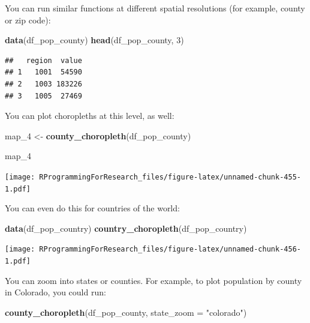 \documentclass[]{book}
\makeatletter
\newenvironment{Shaded}{\begin{snugshade}}{\end{snugshade}}
\newcommand{\KeywordTok}[1]{\textcolor[rgb]{0.13,0.29,0.53}{\textbf{{#1}}}}
\newcommand{\DataTypeTok}[1]{\textcolor[rgb]{0.13,0.29,0.53}{{#1}}}
\newcommand{\DecValTok}[1]{\textcolor[rgb]{0.00,0.00,0.81}{{#1}}}
\newcommand{\StringTok}[1]{\textcolor[rgb]{0.31,0.60,0.02}{{#1}}}
\newcommand{\NormalTok}[1]{{#1}}
\newenvironment{kframe}{%
\medskip{}
\setlength{\fboxsep}{.8em}
 \def\at@end@of@kframe{}%
 \ifinner\ifhmode%
  \def\at@end@of@kframe{\end{minipage}}%
  \begin{minipage}{\columnwidth}%
 \fi\fi%
 \def\FrameCommand##1{\hskip\@totalleftmargin \hskip-\fboxsep
 \colorbox{shadecolor}{##1}\hskip-\fboxsep
     \hskip-\linewidth \hskip-\@totalleftmargin \hskip\columnwidth}%
 \MakeFramed {\advance\hsize-\width
   \@totalleftmargin\z@ \linewidth\hsize
   \@setminipage}}%
 {\par\unskip\endMakeFramed%
 \at@end@of@kframe}
\renewenvironment{Shaded}{\begin{kframe}}{\end{kframe}}
\makeatother
\begin{document}
You can run similar functions at different spatial resolutions (for
example, county or zip code):

\begin{Shaded}
\begin{Highlighting}[]
\KeywordTok{data}\NormalTok{(df_pop_county)}
\KeywordTok{head}\NormalTok{(df_pop_county, }\DecValTok{3}\NormalTok{)}
\end{Highlighting}
\end{Shaded}

\begin{verbatim}
##   region  value
## 1   1001  54590
## 2   1003 183226
## 3   1005  27469
\end{verbatim}

You can plot choropleths at this level, as well:

\begin{Shaded}
\begin{Highlighting}[]
\NormalTok{map_4 <-}\StringTok{ }\KeywordTok{county_choropleth}\NormalTok{(df_pop_county)}
\end{Highlighting}
\end{Shaded}

\begin{Shaded}
\begin{Highlighting}[]
\NormalTok{map_4}
\end{Highlighting}
\end{Shaded}

\texttt{[image: RProgrammingForResearch\_files/figure-latex/unnamed-chunk-455-1.pdf]}

You can even do this for countries of the world:

\begin{Shaded}
\begin{Highlighting}[]
\KeywordTok{data}\NormalTok{(df_pop_country)}
\KeywordTok{country_choropleth}\NormalTok{(df_pop_country)}
\end{Highlighting}
\end{Shaded}

\texttt{[image: RProgrammingForResearch\_files/figure-latex/unnamed-chunk-456-1.pdf]}

You can zoom into states or counties. For example, to plot population by
county in Colorado, you could run:

\begin{Shaded}
\begin{Highlighting}[]
\KeywordTok{county_choropleth}\NormalTok{(df_pop_county, }\DataTypeTok{state_zoom =} \StringTok{"colorado"}\NormalTok{)}
\end{Highlighting}
\end{Shaded}
\end{document}
